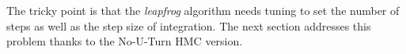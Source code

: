 \documentclass[final,5p,times,twocolumn,authoryear]{elsarticle}
\newcommand{\jaxcosmo}{\texttt{jax-cosmo}}
\begin{document}
The tricky point is that the \textit{leapfrog} algorithm needs tuning to set the number of steps as well as the step size of integration. The next section addresses this problem thanks to the No-U-Turn HMC version.

%
%
%
%
\end{document}
